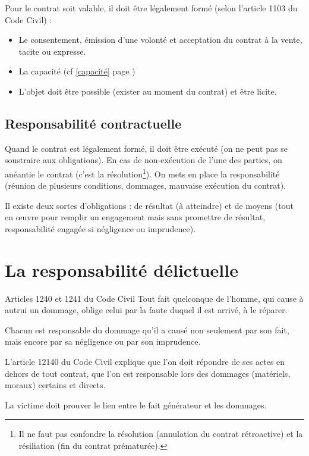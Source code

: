\documentclass[10pt,a4paper]{article}
\begin{document}
Pour le contrat soit valable, il doit être légalement formé (selon l'article 1103 du Code Civil) :
\begin{itemize}
\item Le consentement, émission d'une volonté et acceptation du contrat à la vente, tacite ou expresse.
\item La capacité (cf \ref{capacité} page \pageref{capacité})
\item L'objet doit être possible (exister au moment du contrat) et être licite.
\end{itemize}

\subsection{Responsabilité contractuelle}

Quand le contrat est légalement formé, il doit être exécuté (on ne peut pas se soustraire aux obligations).
En cas de non-exécution de l'une des parties, on anéantie le contrat (c'est la résolution\footnote{Il ne faut pas confondre la résolution (annulation du contrat rétroactive) et la résiliation (fin du contrat prématurée).}).
On mets en place la responsabilité (réunion de plusieurs conditions, dommages, mauvaise exécution du contrat).

Il existe deux sortes d'obligations : de résultat (à atteindre) et de moyens (tout en œuvre pour remplir un engagement mais sans promettre de résultat, responsabilité engagée si négligence ou imprudence).

\section{La responsabilité délictuelle}

\begin{cquote}{Articles 1240 et 1241 du Code Civil}
Tout fait quelconque de l'homme, qui cause à autrui un dommage, oblige celui par la faute duquel il est arrivé, à le réparer.

Chacun est responsable du dommage qu'il a causé non seulement par son fait, mais encore par sa négligence ou par son imprudence.
\end{cquote}

L'article 12140 du Code Civil explique que l'on doit répondre de ses actes en dehors de tout contrat, que l'on est responsable lors des dommages (matériels, moraux) certains et directs.

La victime doit prouver le lien entre le fait générateur et les dommages.
\end{document}
